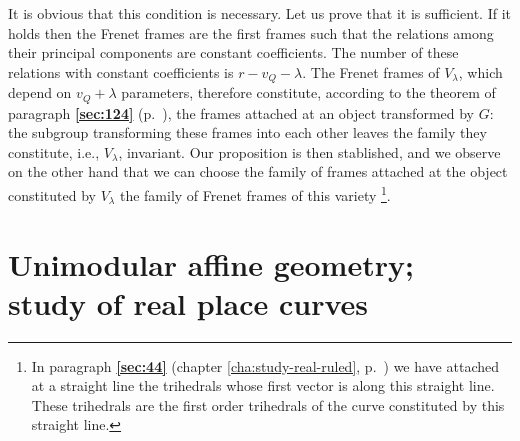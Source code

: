 \documentclass[leqno,11pt]{book}
\numberwithin{equation}{chapter}
\theoremstyle{shape1}
\theoremstyle{shapesmall}
\newcommand{\fsref}[1]{{\rm\textsection\textbf{\ref{sec:#1}}}}
\begin{document}
It is obvious that this condition is necessary. Let us prove that it is sufficient. If it holds then the Frenet frames are the first frames such that the relations among their principal components are constant coefficients. The number of these relations with constant coefficients is $r-v_{Q}-\lambda$. The Frenet frames of $V_{\lambda}$, which depend on $v_{Q}+\lambda$ parameters, therefore constitute, according to the theorem of paragraph \fsref{124} (p.~\pageref{sec:124}), the frames attached at an object transformed by $G$: the subgroup transforming these frames into each other leaves the family they constitute, i.e., $V_{\lambda}$, invariant. Our proposition is then stablished, and we observe on the other hand that we can choose the family of frames attached at the object constituted by $V_{\lambda}$ the family of Frenet frames of this variety \footnote{In paragraph \fsref{44} (chapter \ref{cha:study-real-ruled}, p.~\pageref{sec:44}) we have attached at a straight line the trihedrals whose first vector is along this straight line. These trihedrals are the first order trihedrals of the curve constituted by this straight line.}.


\section[{Unimodular affine geometry; study of real place curves}]{Unimodular affine geometry;\\study of real place curves}
\label{sec:unim-affine-geom}
\end{document}
